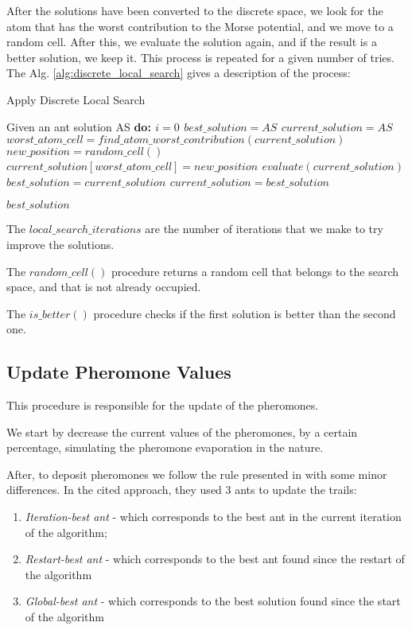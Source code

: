 			After the solutions have been converted to the discrete space, we look for the atom that has the worst contribution to the Morse potential, and we move to a random cell.  After this, we evaluate the solution again, and if the result is a better solution, we keep it. This process is repeated for a given number of tries. The Alg. \ref{alg:discrete_local_search} gives a description of the process:
	
			\begin{algorithm}
				\caption{Apply Discrete Local Search}
				\label{alg:discrete_local_search}
				\begin{algorithmic}
				\STATE Given an ant solution AS \bf{do}:
				\STATE $i = 0$
				\STATE $best\_solution = AS$
				\STATE $current\_solution = AS$
					\STATE $worst\_atom\_cell = find\_atom\_worst\_contribution(current\_solution)$
					\STATE $new\_position = random\_cell()$
					\STATE $current\_solution[worst\_atom\_cell] = new\_position$
					\STATE $evaluate(current\_solution)$
						\STATE $best\_solution = current\_solution$
					\ELSE
						\STATE $current\_solution = best\_solution$
					\ENDIF
				\ENDWHILE
				
				\RETURN $best\_solution$
				\end{algorithmic}
			\end{algorithm}		
			
			The $local\_search\_iterations$ are the number of iterations that we make to try improve the solutions.

			The $random\_cell()$ procedure returns a random cell that belongs to the search space, and that is not already occupied.

			The $is\_better()$ procedure checks if the first solution is better than the second one.
			\subsection{Update Pheromone Values}
			This procedure is responsible for the update of the pheromones. 

			We start by decrease the current values of the pheromones, by a certain percentage, simulating the pheromone evaporation in the nature.

			After, to deposit pheromones we follow the rule presented in \cite{blum04} with some minor differences. In the cited approach, they used 3 ants to update the trails:
			\begin{enumerate}
				\item \emph{Iteration-best ant} - which corresponds to the best ant in the current iteration of the algorithm;
				\item \emph{Restart-best ant} - which corresponds to the best ant found since the restart of the algorithm
				\item \emph{Global-best ant} - which corresponds to the best solution found since the start of the algorithm
			\end{enumerate}
			

